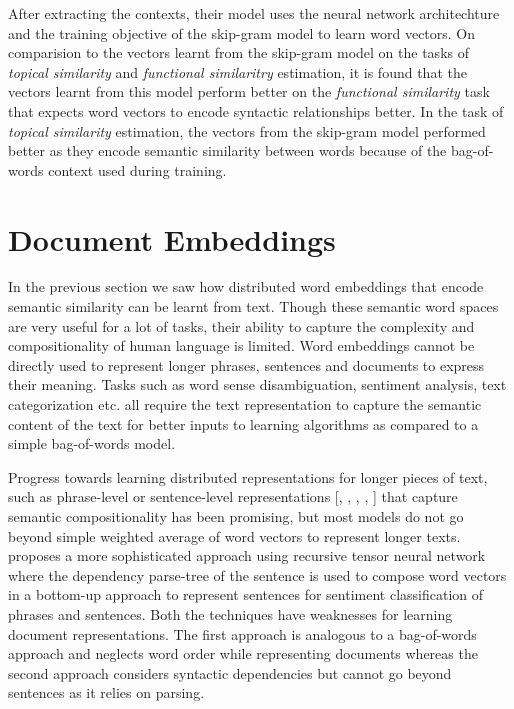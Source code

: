 After extracting the contexts, their model uses the neural network architechture and the training objective of the skip-gram model to learn word vectors. On comparision to the vectors learnt from the skip-gram model on the tasks of \emph{topical similarity} and \emph{functional similaritry} estimation, it is found that the vectors learnt from this model perform better on the \emph{functional similarity} task that expects word vectors to encode syntactic relationships better. In the task of \emph{topical similarity} estimation, the vectors from the skip-gram model performed better as they encode semantic similarity between words because of the bag-of-words context used during training.

\section{Document Embeddings}
\label{sec:document_embeddings}
In the previous section we saw how distributed word embeddings that encode semantic similarity can be learnt from text. 
Though these semantic word spaces are very useful for a lot of tasks, their ability to capture the complexity and compositionality of human language is limited. 
Word embeddings cannot be directly used to represent longer phrases, sentences and documents to express their meaning. 
Tasks such as word sense disambiguation, sentiment analysis, text categorization etc. all require the text representation to capture the semantic content of the text for better inputs to learning algorithms as compared to a simple bag-of-words model. 

Progress towards learning distributed representations for longer pieces of text, such as phrase-level or sentence-level representations [\cite{mitchell2010composition}, \cite{zanzotto2010estimating}, \cite{yessenalina2011compositional}, \cite{grefenstette2013multi}, \cite{mikolov2013distributed}] that capture semantic compositionality has been promising, but most models do not go beyond simple weighted average of word vectors to represent longer texts. 
\cite{socher2013recursive} proposes a more sophisticated approach using recursive tensor neural network where the dependency parse-tree of the sentence is used to compose word vectors in a bottom-up approach to represent sentences for sentiment classification of phrases and sentences. 
Both the techniques have weaknesses for learning document representations. The first approach is analogous to a bag-of-words approach and neglects word order while representing documents whereas the second approach considers syntactic dependencies but cannot go beyond sentences as it relies on parsing.

